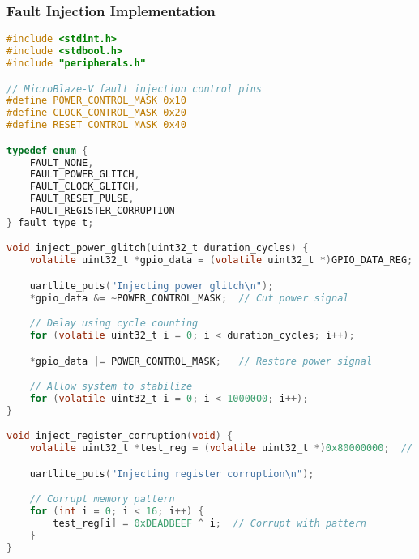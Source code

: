 \documentclass{beamer}
\begin{document}
\begin{frame}[fragile]
\frametitle{Fault Injection Implementation}
\begin{lstlisting}[language=C, basicstyle=\fontsize{4}{2}\selectfont\ttfamily, backgroundcolor={}]
#include <stdint.h>
#include <stdbool.h>
#include "peripherals.h"

// MicroBlaze-V fault injection control pins
#define POWER_CONTROL_MASK 0x10
#define CLOCK_CONTROL_MASK 0x20
#define RESET_CONTROL_MASK 0x40

typedef enum {
    FAULT_NONE,
    FAULT_POWER_GLITCH,
    FAULT_CLOCK_GLITCH,
    FAULT_RESET_PULSE,
    FAULT_REGISTER_CORRUPTION
} fault_type_t;

void inject_power_glitch(uint32_t duration_cycles) {
    volatile uint32_t *gpio_data = (volatile uint32_t *)GPIO_DATA_REG;

    uartlite_puts("Injecting power glitch\n");
    *gpio_data &= ~POWER_CONTROL_MASK;  // Cut power signal

    // Delay using cycle counting
    for (volatile uint32_t i = 0; i < duration_cycles; i++);

    *gpio_data |= POWER_CONTROL_MASK;   // Restore power signal

    // Allow system to stabilize
    for (volatile uint32_t i = 0; i < 1000000; i++);
}

void inject_register_corruption(void) {
    volatile uint32_t *test_reg = (volatile uint32_t *)0x80000000;  // DDR test area

    uartlite_puts("Injecting register corruption\n");

    // Corrupt memory pattern
    for (int i = 0; i < 16; i++) {
        test_reg[i] = 0xDEADBEEF ^ i;  // Corrupt with pattern
    }
}
\end{lstlisting}
\end{frame}
\end{document}

